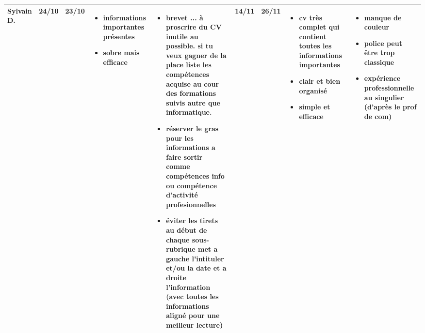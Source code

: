 \documentclass[a4paper,11pt]{article}
\begin{document}
\begin{landscape}
\begin{longtable}{|l|l|l|p{4cm}|p{4cm}|l|l|p{4cm}|p{4cm}|}
    Sylvain D.  & 24/10 & 23/10
    			& \begin{itemize}
				  \item informations importantes présentes
  				  \item sobre mais efficace
				  \end{itemize}
				& \begin{itemize}
				  \item brevet ... à proscrire du CV inutile au possible. si tu veux gagner de la place liste les compétences acquise au cour des formations suivis autre que informatique.
				  \item réserver le gras pour les informations a faire sortir comme compétences info ou compétence d'activité profesionnelles
				  \item éviter les tirets au début de chaque sous-rubrique met a gauche l'intituler et/ou la date et a droite l'information (avec toutes les informations aligné pour une meilleur lecture)
				  \end{itemize} 
    			& 14/11 & 26/11
    			& \begin{itemize}
				  \item cv très complet qui contient toutes les informations importantes
				  \item clair et bien organisé
				  \item simple et efficace
				  \end{itemize}
				& \begin{itemize}
				  \item manque de couleur
				  \item police peut être trop classique
				  \item expérience professionnelle au singulier (d'après le prof de com)
				  \end{itemize} \\ \hline
  \end{longtable}
\end{landscape}
\end{document}
